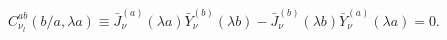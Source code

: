 \begin{equation}
C_{\nu _{l}}^{ab}(b/a,\lambda a)\equiv \bar{J}_{\nu }^{(a)}(\lambda a)\bar{Y}%
_{\nu }^{(b)}(\lambda b)-\bar{J}_{\nu }^{(b)}(\lambda b)\bar{Y}_{\nu
}^{(a)}(\lambda a)=0.  \label{eigmodesab}
\end{equation}

